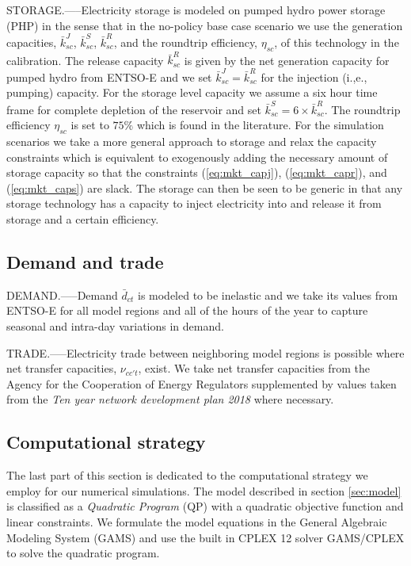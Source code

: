 \documentclass[authoryear]{elsarticle}
\begin{document}
\footnotesize\MakeUppercase{Storage}.-----\normalsize Electricity storage is modeled on pumped hydro power storage (PHP) in the sense that in the no-policy base case scenario we use the generation capacities, $\bar{k}^J_{sc}$, $\bar{k}^S_{sc}$, $\bar{k}^R_{sc}$, and the roundtrip efficiency, $\eta_{sc}$, of this technology in the calibration. The release capacity $\bar{k}_{sc}^R$ is given by the net generation capacity for pumped hydro from ENTSO-E\cite{entsoe-cap} and we set $\bar{k}^J_{sc} =  \bar{k}^R_{sc}$ for the injection (i.,e., pumping) capacity. For the storage level capacity we assume a six hour time frame for complete depletion of the reservoir and set $\bar{k}^S_{sc} = 6 \times \bar{k}^R_{sc}$. The roundtrip efficiency $\eta_{sc}$ is set to $75\%$ which is found in the literature\cite{Egerer2014,Newbery2016}. For the simulation scenarios we take a more general approach to storage and relax the capacity constraints which is equivalent to exogenously adding the necessary amount of storage capacity so that the constraints (\ref{eq:mkt_capj}), (\ref{eq:mkt_capr}), and (\ref{eq:mkt_caps}) are slack. The storage can then be seen to be generic in that any storage technology has a capacity to inject electricity into and release it from storage and a certain efficiency. 

\subsection{Demand and trade}
\footnotesize\MakeUppercase{Demand}.-----\normalsize Demand $\bar{d}_{ct}$ is modeled to be inelastic and we take its values from ENTSO-E\cite{entsoe-load} for all model regions and all of the hours of the year to capture seasonal and intra-day variations in demand.

\footnotesize\MakeUppercase{Trade}.-----\normalsize Electricity trade between neighboring model regions is possible where net transfer capacities, $\nu_{cc't}$, exist. We take net transfer capacities from the Agency for the Cooperation of Energy Regulators\cite{acer2018} supplemented by values taken from the \textit{Ten year network development plan 2018}\cite{tyndp2018} where necessary.


\subsection{Computational strategy}
The last part of this section is dedicated to the computational strategy we employ for our numerical simulations. The model described in section \ref{sec:model} is classified as a \textit{Quadratic Program} (QP) with a quadratic objective function and linear constraints. We formulate the model equations in the General Algebraic Modeling System (GAMS) and use the built in CPLEX 12 solver GAMS/CPLEX to solve the quadratic program.

%

\end{document}
